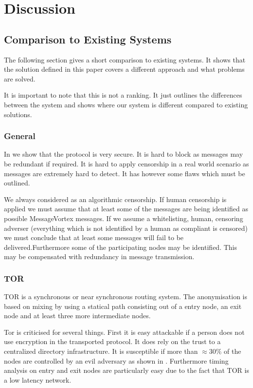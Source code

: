 \documentclass[9pt,journal,compsoc]{IEEEtran}
\begin{document}
\section{Discussion}

\subsection{Comparison to Existing Systems}
The following section gives a short comparison to existing systems. It shows that the solution defined in this paper covers a different approach and what problems are solved. 

It is important to note that this is not a ranking. It just outlines the differences between the system and shows where our system is different compared to existing solutions.

\subsubsection{General}
In \cite{messageVortex} we show that the protocol is very secure. It is hard to block as messages may be redundant if required. It is hard to apply censorship in a real world scenario as messages are extremely hard to detect. It has however some flaws which must be outlined.

We always considered as an algorithmic censorship. If human censorship is applied we must assume that at least some of the messages are being identified as possible MessageVortex messages. If we assume a whitelisting, human, censoring adverser (everything which is not identified by a human as compliant is censored) we must conclude that at least some messages will fail to be delivered.Furthermore some of the participating nodes may be identified. This may be compensated with redundancy in message transmission.

\subsubsection{TOR}
TOR\cite{tor-spec} is a synchronous or near synchronous routing system. The anonymisation is based on mixing by using a statical path consisting out of a entry node, an exit node and at least three more intermediate nodes.

Tor is criticised for several things. First it is easy attackable if a person does not use encryption in the transported protocol. It does rely on the trust to a centralized directory infrastructure. It is susceptible if more than $\approx 30\%$ of the nodes are controlled by an evil adversary as shown in \cite{jansen2014sniper}. Furthermore timing analysis on entry and exit nodes are particularly easy due to the fact that TOR is a low latency network\cite{torta05,esorics10-bandwidth}.
\end{document}
